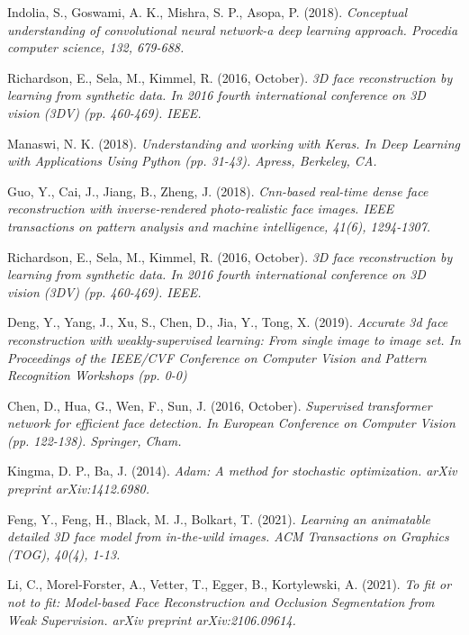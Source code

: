 \documentclass[12pt,a4]{article}
\begin{document}
\begin{thebibliography}{9}
		Indolia, S., Goswami, A. K., Mishra, S. P., Asopa, P. (2018).
		\textit{ Conceptual
			understanding of convolutional neural network-a deep learning approach.
			Procedia computer science, 132, 679-688.}
	
	
	Richardson, E., Sela, M., Kimmel, R. (2016, October). 
	\textit{3D face reconstruction by learning from synthetic data. In 2016 fourth international conference on 3D vision (3DV) (pp. 460-469). IEEE.}
	
	Manaswi, N. K. (2018).
	\textit{Understanding and working with Keras. In Deep
		Learning with Applications Using Python (pp. 31-43). Apress, Berkeley,
		CA.}
	
	Guo, Y., Cai, J., Jiang, B., Zheng, J. (2018).
	\textit{Cnn-based real-time
		dense face reconstruction with inverse-rendered photo-realistic face images. IEEE transactions on pattern analysis and machine intelligence,
		41(6), 1294-1307.}
	
	 Richardson, E., Sela, M., Kimmel, R. (2016, October).
	\textit{3D face reconstruction by learning from synthetic data. In 2016 fourth international conference on 3D vision (3DV) (pp. 460-469). IEEE.}
	
	Deng, Y., Yang, J., Xu, S., Chen, D., Jia, Y., Tong, X. (2019).
	\textit{Accurate
		3d face reconstruction with weakly-supervised learning: From single image
		to image set. In Proceedings of the IEEE/CVF Conference on Computer
		Vision and Pattern Recognition Workshops (pp. 0-0)}
	
	Chen, D., Hua, G., Wen, F., Sun, J. (2016, October). 
	\textit{Supervised transformer network for efficient face detection. In European Conference on
		Computer Vision (pp. 122-138). Springer, Cham.}
	
	Kingma, D. P., Ba, J. (2014).
	\textit{Adam: A method for stochastic optimization. arXiv preprint arXiv:1412.6980.}
	
	Feng, Y., Feng, H., Black, M. J., Bolkart, T. (2021).
	\textit{Learning an animatable detailed 3D face model from in-the-wild images. ACM Transactions
		on Graphics (TOG), 40(4), 1-13.}
	
	Li, C., Morel-Forster, A., Vetter, T., Egger, B., Kortylewski, A. (2021).
	\textit{To fit or not to fit: Model-based Face Reconstruction and Occlusion Segmentation from Weak Supervision. arXiv preprint arXiv:2106.09614.}
	

\end{thebibliography}
\end{document}
